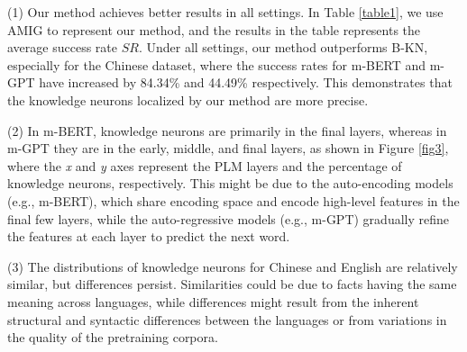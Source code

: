 \documentclass[]{article}
\begin{document}
(1) Our method achieves better results in all settings. In Table \ref{table1}, we use AMIG to represent our method, and the results in the table represents the average success rate \( SR \). Under all settings, our method outperforms B-KN, especially for the Chinese dataset, where the success rates for m-BERT and m-GPT have increased by 84.34\% and 44.49\% respectively. This demonstrates that the knowledge neurons localized by our method are more precise.

(2) In m-BERT, knowledge neurons are primarily in the final layers, whereas in m-GPT they are in the early, middle, and final layers, as shown in Figure \ref{fig3}, where the \textit{x} and \textit{y} axes represent the PLM layers and the percentage of knowledge neurons, respectively. This might be due to the auto-encoding models (e.g., m-BERT), which share encoding space and encode high-level features in the final few layers, while the auto-regressive models (e.g., m-GPT) gradually refine the features at each layer to predict the next word.

(3) The distributions of knowledge neurons for Chinese and English are relatively similar, but differences persist. Similarities could be due to facts having the same meaning across languages, while differences might result from the inherent structural and syntactic differences between the languages or from variations in the quality of the pretraining corpora.
\begin{table}
\centering
{}
\caption{Results of the localization of knowledge neurons. B-KN is the baseline method, the symbol ``\textuparrow" indicates the increase in success rate compared to B-KN for our method, which can be expressed as: $\frac{{\text{AMIG}-\text{B-KN}}}{{\text{B-KN}}}$, and bold indicates the method with a higher $SR$.}
\label{table1}
\end{table}
\end{document}
